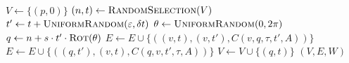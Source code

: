 \begin{algorithm}[ht]
    \caption{$\Function{TemporalRoadmap}(N, d, \delta t, s, p, O, A)$}
    \\
    \label{algo:diprm}
    \begin{algorithmic}[1]
        \setcounter{ALC@line}{0}
        \vspace*{1mm}

        \STATE $V \leftarrow \{(p, 0)\}$
            \STATE $(n, t) \leftarrow \Function{RandomSelection}(V)$
            \STATE $t' \leftarrow t + \Function{UniformRandom}(\varepsilon, \delta t)$
            \STATE $\theta \leftarrow \Function{UniformRandom}(0, 2\pi)$
            \STATE $q \leftarrow n + s \cdot t' \cdot \Function{Rot}(\theta)$
                            \STATE $E \leftarrow E \cup \{((v, t), (v, t'),
                            C(v, q, \tau, t', A))\}$
                        \ELSE
                            \STATE $E \leftarrow E \cup \{((q, t'), (v, t),
                            C(q, v, t', \tau, A))\}$
                        \ENDIF
                    \ENDIF
                \ENDFOR
                \STATE $V \leftarrow V \cup \{(q, t)\}$
            \ENDIF
        \ENDFOR
        \RETURN $(V, E, W)$
    \end{algorithmic}
\end{algorithm}

